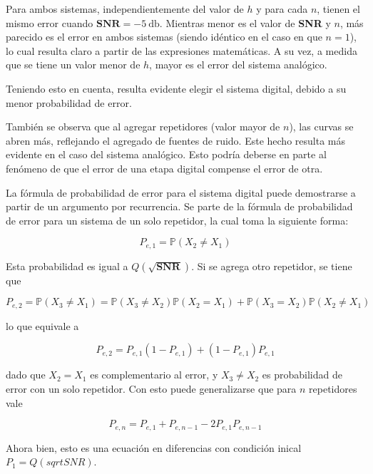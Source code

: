 Para ambos sistemas, independientemente del valor de $h$ y para cada $n$, tienen el mismo error cuando $\textbf{SNR}=\SI{-5}{\decibel}$. Mientras menor es el valor de \textbf{SNR} y $n$, más parecido es el error en ambos sistemas (siendo idéntico en el caso en que $n=1$), lo cual resulta claro a partir de las expresiones matemáticas. A su vez, a medida que se tiene un valor menor de $h$, mayor es el error del sistema analógico. 

Teniendo esto en cuenta, resulta evidente elegir el sistema digital, debido a su menor probabilidad de error.

También se observa que al agregar repetidores (valor mayor de $n$), las curvas se abren más, reflejando el agregado de fuentes de ruido. Este hecho resulta más evidente en el caso del sistema analógico. Esto podría deberse en parte al fenómeno de que el error de una etapa digital compense el error de otra. 

La fórmula de probabilidad de error para el sistema digital puede demostrarse a partir de un argumento por recurrencia. Se parte de la fórmula de probabilidad de error para un sistema de un solo repetidor, la cual toma la siguiente forma:

\begin{equation}
P_{e,1}=\mathbb{P}(X_2\neq X_1) 
\end{equation} 

Esta probabilidad es igual a $Q(\sqrt{\textbf{SNR}})$. Si se agrega otro repetidor, se tiene que

\begin{equation}
P_{e,2}=\mathbb{P}(X_3\neq X_1)=\mathbb{P}(X_3\neq X_2)\mathbb{P}(X_2 = X_1)+\mathbb{P}(X_3 = X_2)\mathbb{P}(X_2\neq X_1)
\end{equation} 

lo que equivale a 

\begin{equation}
P_{e,2}=P_{e,1}(1-P_{e,1})+(1-P_{e,1})P_{e,1}
\end{equation} 

dado que $X_2 = X_1$ es complementario al error, y $X_3 \neq X_2$ es probabilidad de error con un solo repetidor. Con esto puede generalizarse que para $n$ repetidores vale

\begin{equation}
P_{e,n}=P_{e,1}+P_{e,n-1}-2P_{e,1}P_{e,n-1}
\end{equation} 

Ahora bien, esto es una ecuación en diferencias con condición inical $P_1 = Q(sqrt{SNR})$. 

